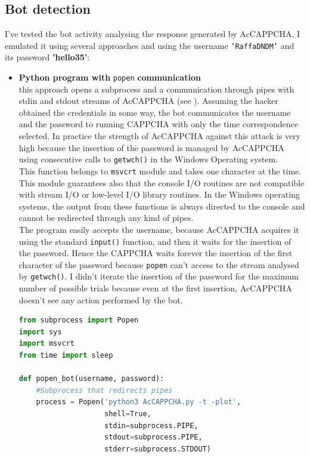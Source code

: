 \subsection{Bot detection}
I've tested the bot activity analysing the response generated by AcCAPPCHA. I emulated it using several approaches and using the username \texttt{'RaffaDNDM'} and its password \textbf{'hello35'}:
\begin{itemize}
\item{\textbf{Python program with} \texttt{popen} \textbf{communication}\\
this approach opens a subprocess and a communication through pipes with stdin and stdout streams of AcCAPPCHA (see ). Assuming the hacker obtained the credentials in some way, the bot communicates the username and the password to running CAPPCHA with only the time correspondence selected. In practice the strength of AcCAPPCHA against this attack is very high because the insertion of the password is managed by AcCAPPCHA using consecutive calls to \texttt{getwch()} in the Windows Operating system. \\
This function belongs to \texttt{msvcrt} module and takes one character at the time. This module guarantees also that the console I/O routines are not compatible with stream I/O or low-level I/O library routines. In the Windows operating systems, the output from these functions is always directed to the console and cannot be redirected through any kind of pipes.\\
The program easily accepts the username, because AcCAPPCHA acquires it using the standard \texttt{input()} function, and then it waits for the insertion of the password. Hence the CAPPCHA waits forever the insertion of the first character of the password because \texttt{popen} can't access to the stream analysed by \texttt{getwch()}. I didn't iterate the insertion of the password for the maximum number of possible trials because even at the first insertion, AcCAPPCHA doesn't see any action performed by the bot.
\begin{lstlisting}[language=python, showstringspaces=false, tabsize=4, basicstyle=\footnotesize, caption={\footnotesize{Bot using popen.}},label={Results:popen_bot}]
from subprocess import Popen
import sys
import msvcrt
from time import sleep

def popen_bot(username, password):
    #Subprocess that redirects pipes
    process = Popen('python3 AcCAPPCHA.py -t -plot',
    				shell=True, 
    				stdin=subprocess.PIPE,
    				stdout=subprocess.PIPE,
    				stderr=subprocess.STDOUT)


\end{lstlisting}}
\end{itemize}
